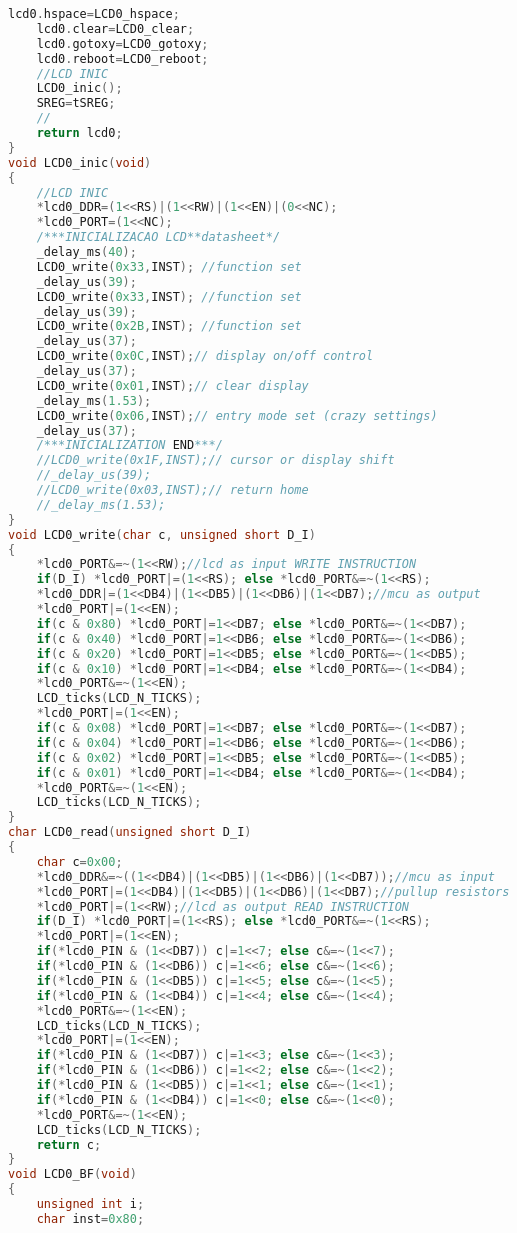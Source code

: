 \begin{lstlisting}[language=C, caption={lcd.c}, label=lcd-c, captionpos=b]
	lcd0.hspace=LCD0_hspace;
	lcd0.clear=LCD0_clear;
	lcd0.gotoxy=LCD0_gotoxy;
	lcd0.reboot=LCD0_reboot;
	//LCD INIC
	LCD0_inic();
	SREG=tSREG;
	//
	return lcd0;
}
void LCD0_inic(void)
{
	//LCD INIC
	*lcd0_DDR=(1<<RS)|(1<<RW)|(1<<EN)|(0<<NC);
	*lcd0_PORT=(1<<NC);
	/***INICIALIZACAO LCD**datasheet*/
	_delay_ms(40);
	LCD0_write(0x33,INST); //function set
	_delay_us(39);
	LCD0_write(0x33,INST); //function set
	_delay_us(39);
	LCD0_write(0x2B,INST); //function set
	_delay_us(37);
	LCD0_write(0x0C,INST);// display on/off control
	_delay_us(37);
	LCD0_write(0x01,INST);// clear display
	_delay_ms(1.53);
	LCD0_write(0x06,INST);// entry mode set (crazy settings)
	_delay_us(37);
	/***INICIALIZATION END***/
	//LCD0_write(0x1F,INST);// cursor or display shift
	//_delay_us(39);
	//LCD0_write(0x03,INST);// return home
	//_delay_ms(1.53);
}
void LCD0_write(char c, unsigned short D_I)
{
	*lcd0_PORT&=~(1<<RW);//lcd as input WRITE INSTRUCTION
	if(D_I) *lcd0_PORT|=(1<<RS); else *lcd0_PORT&=~(1<<RS);
	*lcd0_DDR|=(1<<DB4)|(1<<DB5)|(1<<DB6)|(1<<DB7);//mcu as output
	*lcd0_PORT|=(1<<EN);
	if(c & 0x80) *lcd0_PORT|=1<<DB7; else *lcd0_PORT&=~(1<<DB7);
	if(c & 0x40) *lcd0_PORT|=1<<DB6; else *lcd0_PORT&=~(1<<DB6);
	if(c & 0x20) *lcd0_PORT|=1<<DB5; else *lcd0_PORT&=~(1<<DB5);
	if(c & 0x10) *lcd0_PORT|=1<<DB4; else *lcd0_PORT&=~(1<<DB4);
	*lcd0_PORT&=~(1<<EN);
	LCD_ticks(LCD_N_TICKS);
	*lcd0_PORT|=(1<<EN);
	if(c & 0x08) *lcd0_PORT|=1<<DB7; else *lcd0_PORT&=~(1<<DB7);
	if(c & 0x04) *lcd0_PORT|=1<<DB6; else *lcd0_PORT&=~(1<<DB6);
	if(c & 0x02) *lcd0_PORT|=1<<DB5; else *lcd0_PORT&=~(1<<DB5);
	if(c & 0x01) *lcd0_PORT|=1<<DB4; else *lcd0_PORT&=~(1<<DB4);
	*lcd0_PORT&=~(1<<EN);
	LCD_ticks(LCD_N_TICKS);
}
char LCD0_read(unsigned short D_I)
{
	char c=0x00;
	*lcd0_DDR&=~((1<<DB4)|(1<<DB5)|(1<<DB6)|(1<<DB7));//mcu as input
	*lcd0_PORT|=(1<<DB4)|(1<<DB5)|(1<<DB6)|(1<<DB7);//pullup resistors
	*lcd0_PORT|=(1<<RW);//lcd as output READ INSTRUCTION
	if(D_I) *lcd0_PORT|=(1<<RS); else *lcd0_PORT&=~(1<<RS);
	*lcd0_PORT|=(1<<EN);
	if(*lcd0_PIN & (1<<DB7)) c|=1<<7; else c&=~(1<<7);
	if(*lcd0_PIN & (1<<DB6)) c|=1<<6; else c&=~(1<<6);
	if(*lcd0_PIN & (1<<DB5)) c|=1<<5; else c&=~(1<<5);
	if(*lcd0_PIN & (1<<DB4)) c|=1<<4; else c&=~(1<<4);
	*lcd0_PORT&=~(1<<EN);
	LCD_ticks(LCD_N_TICKS);
	*lcd0_PORT|=(1<<EN);
	if(*lcd0_PIN & (1<<DB7)) c|=1<<3; else c&=~(1<<3);
	if(*lcd0_PIN & (1<<DB6)) c|=1<<2; else c&=~(1<<2);
	if(*lcd0_PIN & (1<<DB5)) c|=1<<1; else c&=~(1<<1);
	if(*lcd0_PIN & (1<<DB4)) c|=1<<0; else c&=~(1<<0);
	*lcd0_PORT&=~(1<<EN);
	LCD_ticks(LCD_N_TICKS);
	return c;
}
void LCD0_BF(void)
{
	unsigned int i;
	char inst=0x80;

\end{lstlisting}
